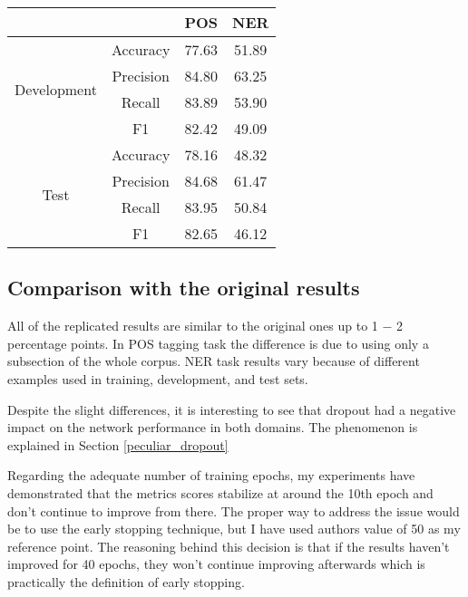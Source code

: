 \begin{center}
\begin{tabular}{ |c|c|c|c| }
\hline
& & {\textbf{POS}} & {\textbf{NER}}\\ \hline
\multirow{4}{*}{Development} & Accuracy & 77.63 & 51.89 \\
 & Precision & 84.80  & 63.25 \\
 & Recall & 83.89 & 53.90 \\
 & F1 & 82.42 & 49.09 \\ \hline
\multirow{4}{*}{Test} & Accuracy & 78.16 & 48.32 \\
 & Precision & 84.68 & 61.47 \\
 & Recall & 83.95 & 50.84 \\
 & F1 & 82.65 & 46.12 \\ \hline
\end{tabular}
\label{tab:no_crf}
\end{center}


\subsection{Comparison with the original results}
All of the replicated results are similar to the original ones up to 1 $-$ 2
percentage points. In POS tagging task the difference is due to using only a subsection of
the whole corpus. NER task results vary because of different examples used
in training, development, and test sets.

Despite the slight differences, it is interesting to see that dropout had a
negative impact on the network performance in both domains. The phenomenon is 
explained in Section \ref{peculiar_dropout}

Regarding the adequate number of training epochs, my experiments have
demonstrated that the metrics scores stabilize at around the 10th epoch and
don't continue to improve from there. The proper way to address the issue would
be to use the early stopping technique, but I have used
authors value of 50 as my reference point. The reasoning behind this decision
is that if the results haven't improved for 40 epochs, they won't continue
improving afterwards which is practically the definition of early stopping.

